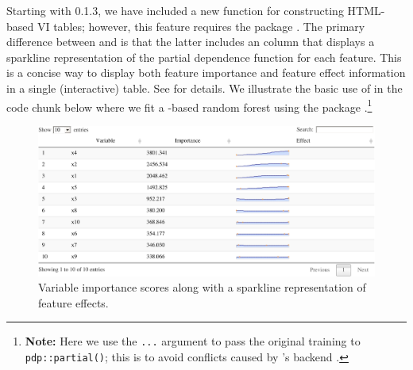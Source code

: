 Starting with  0.1.3, we have included a new function
 for constructing HTML-based VI tables; however,
this feature requires the  package \citep{R-DT}. The primary
difference between  and  is that the
latter includes an  column that displays a sparkline
representation of the partial dependence function for each feature. This
is a concise way to display both feature importance and feature effect
information in a single (interactive) table. See
 for details. We illustrate the basic use of
 in the code chunk below where we fit a
-based random forest using the  package
\citep{R-mlr3}.\footnote{\textbf{Note:} Here we use the \texttt{...}
  argument to pass the original training to \texttt{pdp::partial()};
  this is to avoid conflicts caused by 's 
  backend \citep{R-data.table}.}

\begin{Schunk}
\begin{figure}[!htb]

{\centering \includegraphics[width=1\linewidth]{greenwell-boehmke_files/figure-latex/sparklines-1} 

}

\caption[Variable importance scores along with a sparkline representation of feature effects]{Variable importance scores along with a sparkline representation of feature effects.}\label{fig:sparklines}
\end{figure}
\end{Schunk}


